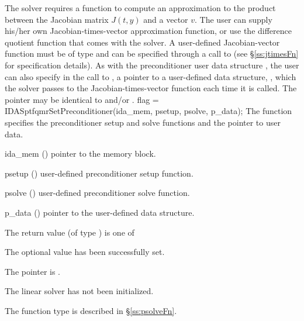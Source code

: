 {The 
{\idasptfqmr} solver requires a function to compute an approximation to the
product between the Jacobian matrix $J(t,y)$ and a vector $v$.
The user can supply his/her own Jacobian-times-vector approximation function, 
or use the difference quotient function  
that comes with the {\idasptfqmr} solver.
A user-defined Jacobian-vector function must be of type 
and can be specified through a call to  
(see \S\ref{ss:jtimesFn} for specification details).
As with the preconditioner user data structure , 
the user can also specify in the call to , a pointer
to a user-defined data structure, , which
the {\idasptfqmr} solver passes to the Jacobian-times-vector function 
each time it is called.  
The pointer  may be identical to  and/or .
{
  flag = IDASptfqmrSetPreconditioner(ida\_mem, psetup, psolve, p\_data);
}
{
  The function  specifies the preconditioner
  setup and solve functions and the pointer to user data.
}
{
  \begin{args}
  \item[ida\_mem] ()
    pointer to the {\ida} memory block.
  \item[psetup] ()
    user-defined preconditioner setup function.
  \item[psolve] ()
    user-defined preconditioner solve function.
  \item[p\_data] ()
     pointer to the user-defined data structure.
  \end{args}
}
{
  The return value  (of type ) is one of
  \begin{args}
  \item[\Id{IDASPTFQMR\_SUCCESS}] 
    The optional value has been successfully set.
  \item[\Id{IDASPTFQMR\_MEM\_NULL}]
    The  pointer is .
  \item[\Id{IDASPTFQMR\_LMEM\_NULL}]
    The {\idasptfqmr} linear solver has not been initialized.
  \end{args}
}
{
   The function type  is described in \S\ref{ss:psolveFn}.
}}
